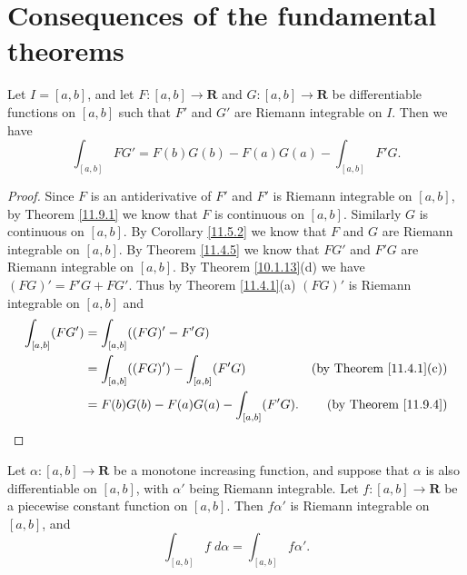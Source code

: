\section{Consequences of the fundamental theorems}\label{sec 11.10}

\begin{proposition}\label{11.10.1}
    Let \(I = [a, b]\), and let \(F : [a, b] \to \mathbf{R}\) and \(G : [a, b] \to \mathbf{R}\) be differentiable functions on \([a, b]\) such that \(F'\) and \(G'\) are Riemann integrable on \(I\).
    Then we have
    \[
        \int_{[a, b]} F G' = F(b) G(b) - F(a) G(a) - \int_{[a, b]} F' G.
    \]
\end{proposition}

\begin{proof}
    Since \(F\) is an antiderivative of \(F'\) and \(F'\) is Riemann integrable on \([a, b]\), by Theorem \ref{11.9.1} we know that \(F\) is continuous on \([a, b]\).
    Similarly \(G\) is continuous on \([a, b]\).
    By Corollary \ref{11.5.2} we know that \(F\) and \(G\) are Riemann integrable on \([a, b]\).
    By Theorem \ref{11.4.5} we know that \(F G'\) and \(F' G\) are Riemann integrable on \([a, b]\).
    By Theorem \ref{10.1.13}(d) we have \((FG)' = F' G + F G'\).
    Thus by Theorem \ref{11.4.1}(a) \((FG)'\) is Riemann integrable on \([a, b]\) and
    \begin{align*}
        \int_{[a, b]} (F G') & = \int_{[a, b]} ((FG)' - F' G)                                                        \\
                             & = \int_{[a, b]} ((FG)') - \int_{[a, b]} (F' G)  & \text{(by Theorem \ref{11.4.1}(c))} \\
                             & = F(b) G(b) - F(a) G(a) - \int_{[a, b]} (F' G). & \text{(by Theorem \ref{11.9.4})}
    \end{align*}
\end{proof}

\begin{theorem}\label{11.10.2}
    Let \(\alpha : [a, b] \to \mathbf{R}\) be a monotone increasing function, and suppose that \(\alpha\) is also differentiable on \([a, b]\), with \(\alpha'\) being Riemann integrable.
    Let \(f : [a, b] \to \mathbf{R}\) be a piecewise constant function on \([a, b]\).
    Then \(f \alpha'\) is Riemann integrable on \([a, b]\), and
    \[
        \int_{[a, b]} f \; d \alpha = \int_{[a, b]} f \alpha'.
    \]
\end{theorem}

